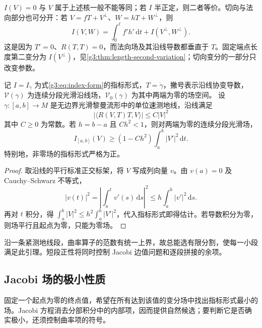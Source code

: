 \(I(V)=0\) 与 \(V\) 属于上述核一般不能等同；若 \(I\) 半正定，则二者等价。切向与法向部分也可分开：若 \(V=fT+V^\perp\)、\(W=hT+W^\perp\)，则
\begin{equation}\label{g3:eq:index-tangential-normal-split}
	I(V,W)=\int_0^\ell f'h'\,\mathrm dt+I(V^\perp,W^\perp).
\end{equation}
这是因为 \(T'=0\)、\(R(T,T)=0\)，而法向场及其沿线导数都垂直于 \(T\)。固定端点长度第二变分为 \(I(V^\perp)\)，见\cref{g3:thm:length-second-variation}；切向变分的一部分只改变参数。

\begin{lemma}\label{g3:lem:short-interval-index-positive}
	记 \(I=I_\gamma\) 为式\eqref{g3:eq:index-form}的指标形式，\(T=\dot\gamma\)，撇号表示沿线协变导数，\(\mathcal V(\gamma)\) 为连续分段光滑沿线场，\(\mathcal V_0(\gamma)\) 为其中两端为零的场空间。
	设 \(\gamma:[a,b]\to M\) 是无边界光滑黎曼流形中的单位速测地线，沿线满足
	\[
		|\langle R(V,T)T,V\rangle|\le C|V|^2
	\]
	其中 \(C\ge0\) 为常数。若 \(h=b-a\) 且 \(Ch^2<1\)，则对两端为零的连续分段光滑场，
	\[
		I_{[a,b]}(V)\ge(1-Ch^2)\int_a^b|V'|^2\,\mathrm dt.
	\]
	特别地，非零场的指标形式严格为正。
\end{lemma}
\begin{proof}
	取沿线的平行标准正交标架，将 \(V\) 写成列向量 \(v\)。由 \(v(a)=0\) 及 Cauchy--Schwarz 不等式，
	\[
		|v(t)|^2
		=\left|\int_a^t v'(s)\,\mathrm ds\right|^2
		\le h\int_a^b|v'|^2\,\mathrm ds.
	\]
	再对 \(t\) 积分，得
	\(\int_a^b|V|^2\le h^2\int_a^b|V'|^2\)，代入指标形式即得估计。若导数积分为零，则场平行且起点为零，只能为零场。
\end{proof}

沿一条紧测地线段，曲率算子的范数有统一上界，故总能选有限分割，使每一小段满足此引理。短段正性将同时控制 Jacobi 边值问题和逐段拼接的余项。

\subsection{Jacobi 场的极小性质}
\label{g3:subsec:0603:02}

固定一个起点为零的终点值，希望在所有达到该值的变分场中找出指标形式最小的场。Jacobi 方程消去分部积分中的内部项，因而提供自然候选；要判断它是否确实极小，还须控制曲率项的符号。

